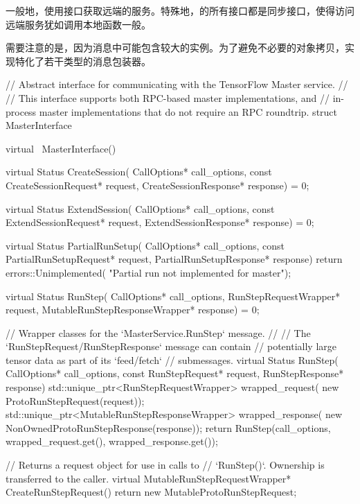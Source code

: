 \begin{content}
\begin{content}
一般地，使用接口获取远端的服务。特殊地，的所有接口都是同步接口，使得访问远端服务犹如调用本地函数一般。

需要注意的是，因为消息中可能包含较大的实例。为了避免不必要的对象拷贝，实现特化了若干类型的消息包装器。

\begin{leftbar}
\begin{c++}
// Abstract interface for communicating with the TensorFlow Master service.
//
// This interface supports both RPC-based master implementations, and
// in-process master implementations that do not require an RPC roundtrip.
struct MasterInterface {
  virtual ~MasterInterface() {}
  
  virtual Status CreateSession(
      CallOptions* call_options,
      const CreateSessionRequest* request,
      CreateSessionResponse* response) = 0;

  virtual Status ExtendSession(
      CallOptions* call_options,
      const ExtendSessionRequest* request,
      ExtendSessionResponse* response) = 0;

  virtual Status PartialRunSetup(
      CallOptions* call_options,
      const PartialRunSetupRequest* request,
      PartialRunSetupResponse* response) {
    return errors::Unimplemented(
      "Partial run not implemented for master");
  }

  virtual Status RunStep(
      CallOptions* call_options,
      RunStepRequestWrapper* request,
      MutableRunStepResponseWrapper* response) = 0;

  // Wrapper classes for the `MasterService.RunStep` message.
  //
  // The `RunStepRequest/RunStepResponse` message can contain 
  // potentially large tensor data as part of its `feed/fetch` 
  // submessages.
  virtual Status RunStep(
    CallOptions* call_options,
    const RunStepRequest* request,
    RunStepResponse* response) {
    std::unique_ptr<RunStepRequestWrapper> wrapped_request(
        new ProtoRunStepRequest(request));
    std::unique_ptr<MutableRunStepResponseWrapper> wrapped_response(
        new NonOwnedProtoRunStepResponse(response));
    return RunStep(call_options, 
        wrapped_request.get(), 
        wrapped_response.get());
  }

  // Returns a request object for use in calls to
  // `RunStep()`. Ownership is transferred to the caller.
  virtual MutableRunStepRequestWrapper* CreateRunStepRequest() {
    return new MutableProtoRunStepRequest;
  }

}
\end{c++}
\end{leftbar}
\end{content}
\end{content}

